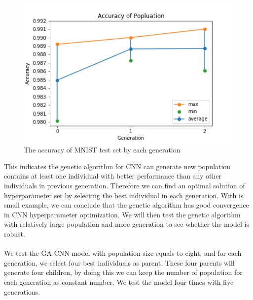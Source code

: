 \documentclass[12pt]{article}
\begin{document}
\begin{figure}
\begin{center}
\includegraphics[width =5.21in]{3gen_test.png}
\caption{The accuracy of MNIST test set by each generation}
\end{center}
\label{fig:pic9}
\end{figure}
This indicates the genetic algorithm for CNN can generate new population contains at least one individual with better performance than any other individuals in previous generation. Therefore we can find an optimal solution of hyperparameter set by selecting the best individual in each generation. With is small example, we can conclude that the genetic algorithm has good convergence in CNN hyperparameter optimization. We will then test the genetic algorithm with relatively large population and more generation to see whether the model is robust.\\
~\\
We test the GA-CNN model with population size equals to eight, and for each generation, we select four best individuals as parent. These four parents will generate four children, by doing this we can keep the number of population for each generation as constant number. We test the model four times with five generations. 
\end{document}
